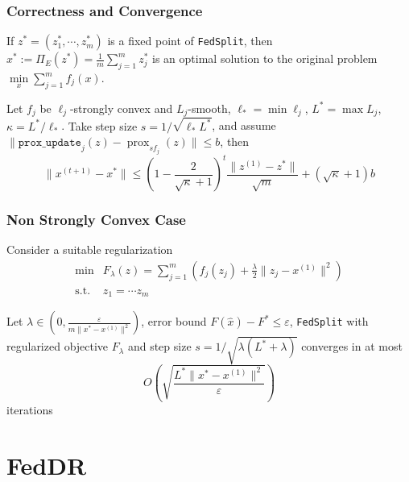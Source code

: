 
\begin{frame}
\frametitle{Correctness and Convergence}

\begin{prop}[Correctness]
If $z^* = (z_1^*, \cdots, z_m^*)$ is a fixed point of \texttt{FedSplit}, then $x^* := \Pi_E(z^*) = \frac{1}{m} \sum_{j=1}^m z_j^*$ is an optimal solution to the original problem $\min\limits_{x} \sum_{j=1}^m f_j(x)$.
\end{prop}

\begin{thm}[Convergence]
Let $f_j$ be $\ell_j$-strongly convex and $L_j$-smooth, $\ell_* = \min \ell_j$, $L^* = \max L_j$, $\kappa = L^*/\ell_*$. {\color{red} Take step size $s = 1 / \sqrt{\ell_*L^*}$}, and assume $\lVert \texttt{prox\_update}_j(z) - \operatorname{prox}_{sf_j}(z) \rVert \leqslant b$, then
$$\lVert x^{(t+1)} - x^* \rVert \leqslant \left( 1 - \frac{2}{\sqrt{\kappa}+1} \right)^t \frac{\lVert z^{(1)} - z^* \rVert}{\sqrt{m}} + (\sqrt{\kappa}+1)b$$
\end{thm}

\end{frame}


\begin{frame}
\frametitle{Non Strongly Convex Case}

Consider a suitable regularization
\begin{align*}
\min & F_{\lambda}(z) = \sum_{j=1}^m \left( f_j(z_j) + \frac{\lambda}{2}\lVert z_j - x^{(1)} \rVert^2 \right) \\
\text{s.t.} & z_1 = \cdots z_m
\end{align*}

\begin{thm}
Let $\lambda \in \left(0, \frac{\varepsilon}{m\lVert x^* - x^{(1)} \rVert^2}\right)$, error bound $F(\widehat{x}) - F^* \leqslant \varepsilon$, \texttt{FedSplit} with regularized objective $F_{\lambda}$ and step size $s = 1/\sqrt{\lambda(L^*+\lambda)}$ converges in at most
$$O \left( \sqrt{\frac{L^*\lVert x^* - x^{(1)} \rVert^2}{\varepsilon}} \right)$$
iterations
\end{thm}

\end{frame}


\section{FedDR}

